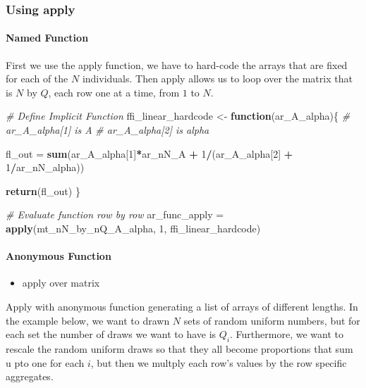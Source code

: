 \documentclass[
]{book}
\newenvironment{Shaded}{\begin{snugshade}}{\end{snugshade}}
\newcommand{\CommentTok}[1]{\textcolor[rgb]{0.56,0.35,0.01}{\textit{#1}}}
\newcommand{\ControlFlowTok}[1]{\textcolor[rgb]{0.13,0.29,0.53}{\textbf{#1}}}
\newcommand{\DecValTok}[1]{\textcolor[rgb]{0.00,0.00,0.81}{#1}}
\newcommand{\KeywordTok}[1]{\textcolor[rgb]{0.13,0.29,0.53}{\textbf{#1}}}
\newcommand{\NormalTok}[1]{#1}
\newcommand{\OperatorTok}[1]{\textcolor[rgb]{0.81,0.36,0.00}{\textbf{#1}}}
\newcommand{\StringTok}[1]{\textcolor[rgb]{0.31,0.60,0.02}{#1}}
\providecommand{\tightlist}{%
  \setlength{\itemsep}{0pt}\setlength{\parskip}{0pt}}
\begin{document}
\hypertarget{using-apply}{%
\subsubsection{Using apply}\label{using-apply}}

\hypertarget{named-function}{%
\paragraph{Named Function}\label{named-function}}

First we use the apply function, we have to hard-code the arrays that are fixed for each of the \(N\) individuals. Then apply allows us to loop over the matrix that is \(N\) by \(Q\), each row one at a time, from \(1\) to \(N\).

\begin{Shaded}
\begin{Highlighting}[]
\CommentTok{\# Define Implicit Function}
\NormalTok{ffi\_linear\_hardcode \textless{}{-}}\StringTok{ }\ControlFlowTok{function}\NormalTok{(ar\_A\_alpha)\{}
  \CommentTok{\# ar\_A\_alpha[1] is A}
  \CommentTok{\# ar\_A\_alpha[2] is alpha}

\NormalTok{  fl\_out =}\StringTok{ }\KeywordTok{sum}\NormalTok{(ar\_A\_alpha[}\DecValTok{1}\NormalTok{]}\OperatorTok{*}\NormalTok{ar\_nN\_A }\OperatorTok{+}
\StringTok{                 }\DecValTok{1}\OperatorTok{/}\NormalTok{(ar\_A\_alpha[}\DecValTok{2}\NormalTok{] }\OperatorTok{+}\StringTok{ }\DecValTok{1}\OperatorTok{/}\NormalTok{ar\_nN\_alpha))}

  \KeywordTok{return}\NormalTok{(fl\_out)}
\NormalTok{\}}

\CommentTok{\# Evaluate function row by row}
\NormalTok{ar\_func\_apply =}\StringTok{ }\KeywordTok{apply}\NormalTok{(mt\_nN\_by\_nQ\_A\_alpha, }\DecValTok{1}\NormalTok{, ffi\_linear\_hardcode)}
\end{Highlighting}
\end{Shaded}

\hypertarget{anonymous-function}{%
\paragraph{Anonymous Function}\label{anonymous-function}}

\begin{itemize}
\tightlist
\item
  apply over matrix
\end{itemize}

Apply with anonymous function generating a list of arrays of different lengths. In the example below, we want to drawn \(N\) sets of random uniform numbers, but for each set the number of draws we want to have is \(Q_i\). Furthermore, we want to rescale the random uniform draws so that they all become proportions that sum u pto one for each \(i\), but then we multply each row's values by the row specific aggregates.
\end{document}
